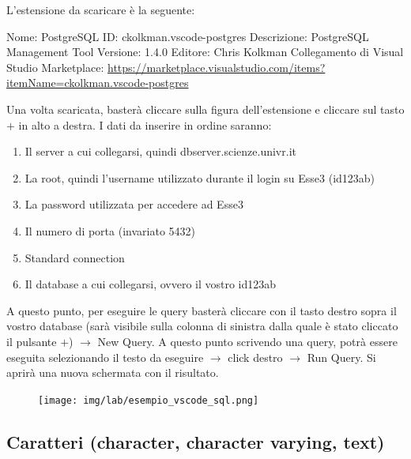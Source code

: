\documentclass[a4paper]{article}
\begin{document}
	\noindent
	L'estensione da scaricare è la seguente:\newline
	
	\noindent
	\textsf{Nome:} PostgreSQL\newline
	\textsf{ID:} ckolkman.vscode-postgres\newline
	\textsf{Descrizione:} PostgreSQL Management Tool\newline
	\textsf{Versione:} 1.4.0\newline
	\textsf{Editore:} Chris Kolkman\newline
	\textsf{Collegamento di Visual Studio Marketplace:} \url{https://marketplace.visualstudio.com/items?itemName=ckolkman.vscode-postgres}\newline
	
	\noindent
	Una volta scaricata, basterà cliccare sulla figura dell'estensione e cliccare sul tasto $+$ in alto a destra. I dati da inserire in ordine saranno:
	\begin{enumerate}
		\item Il server a cui collegarsi, quindi \textsf{dbserver.scienze.univr.it}
		\item La root, quindi l'username utilizzato durante il login su Esse3 (id123ab)
		\item La password utilizzata per accedere ad Esse3
		\item Il numero di porta (invariato 5432)
		\item Standard connection
		\item Il database a cui collegarsi, ovvero il vostro id123ab
	\end{enumerate}
	A questo punto, per eseguire le query basterà cliccare con il tasto destro sopra il vostro database (sarà visibile sulla colonna di sinistra dalla quale è stato cliccato il pulsante $+$) $\rightarrow$ \textsf{New Query}. A questo punto scrivendo una query, potrà essere eseguita selezionando il testo da eseguire $\rightarrow$ click destro $\rightarrow$ \textsf{Run Query}. Si aprirà una nuova schermata con il risultato.
	\begin{figure}[!htp]
		\centering
		\texttt{[image: img/lab/esempio\_vscode\_sql.png]}
	\end{figure}\newpage
	
	\subsection{Caratteri (\textsf{character}, \textsf{character varying}, \textsf{text})}
	
\end{document}

